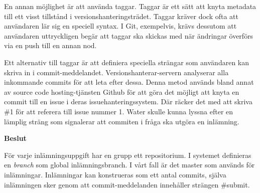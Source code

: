 En annan möjlighet är att använda taggar. Taggar är ett sätt att knyta metadata till ett visst tillstånd i versionshanteringsträdet. Taggar kräver dock ofta att användaren lär sig en speciell syntax. I Git, exempelvis, krävs dessutom att användaren uttryckligen begär att taggar ska skickas med när ändringar överförs via en push till en annan nod.

Ett alternativ till taggar är att definiera speciella strängar som användaren kan skriva in i commit-meddelandet. Versionshanterar-servern analyserar alla inkommande commits för att leta efter dessa. Denna metod används bland annat av source code hosting-tjänsten Github för att göra det möjligt att knyta en commit till en issue i deras issuehanteringssystem. Där räcker det med att skriva \#1 för att referera till issue nummer 1. Water skulle kunna lyssna efter en lämplig sträng som signalerar att commiten i fråga ska utgöra en inlämning.

\begin{flushright}
  
  \textbf{Beslut}
  
  För varje inlämningsuppgift har en grupp ett repositorium. I systemet definieras en \emph{branch} som global inlämningsbranch. I vårt fall är det master som används för inlämningar. Inlämningar kan konstrueras som ett antal commits, själva inlämningen sker genom att commit-meddelanden innehåller strängen \#submit.
\end{flushright}
